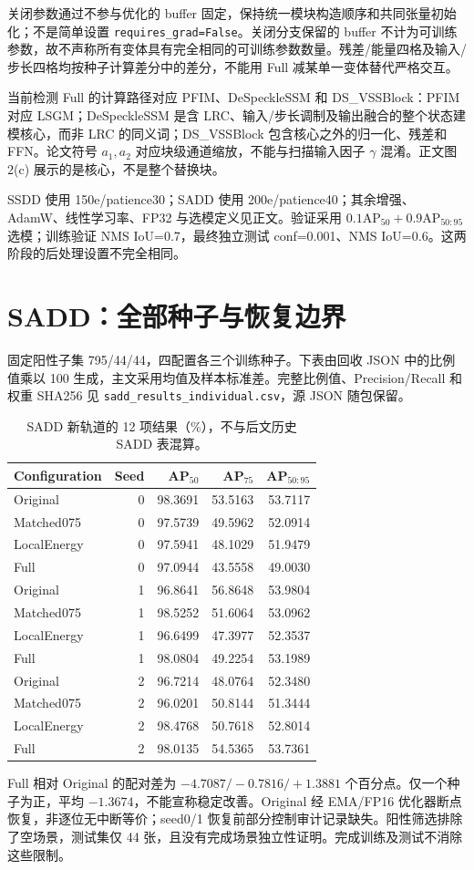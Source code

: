 \documentclass[UTF8,fontset=fandol,10pt]{ctexart}
\begin{document}
关闭参数通过不参与优化的 buffer 固定，保持统一模块构造顺序和共同张量初始化；不是简单设置 \texttt{requires\_grad=False}。关闭分支保留的 buffer 不计为可训练参数，故不声称所有变体具有完全相同的可训练参数数量。残差/能量四格及输入/步长四格均按种子计算差分中的差分，不能用 Full 减某单一变体替代严格交互。

当前检测 Full 的计算路径对应 PFIM、DeSpeckleSSM 和 DS\_VSSBlock：PFIM 对应 LSGM；DeSpeckleSSM 是含 LRC、输入/步长调制及输出融合的整个状态建模核心，而非 LRC 的同义词；DS\_VSSBlock 包含核心之外的归一化、残差和 FFN。论文符号 $a_1,a_2$ 对应块级通道缩放，不能与扫描输入因子 $\gamma$ 混淆。正文图 2(c) 展示的是核心，不是整个替换块。

SSDD 使用 150e/patience30；SADD 使用 200e/patience40；其余增强、AdamW、线性学习率、FP32 与选模定义见正文。验证采用 $0.1\mathrm{AP}_{50}+0.9\mathrm{AP}_{50:95}$ 选模；训练验证 NMS IoU=0.7，最终独立测试 conf=0.001、NMS IoU=0.6。这两阶段的后处理设置不完全相同。

\section{SADD：全部种子与恢复边界}
固定阳性子集 795/44/44，四配置各三个训练种子。下表由回收 JSON 中的比例值乘以 100 生成，主文采用均值及样本标准差。完整比例值、Precision/Recall 和权重 SHA256 见 \texttt{sadd\_results\_individual.csv}，源 JSON 随包保留。
\begin{table}[!htbp]
\centering\small
\caption{SADD 新轨道的 12 项结果（\%），不与后文历史 SADD 表混算。}
\begin{tabular}{lrrrr}
\toprule
Configuration & Seed & AP$_{50}$ & AP$_{75}$ & AP$_{50:95}$\\
\midrule
Original & 0 & 98.3691 & 53.5163 & 53.7117 \\
Matched075 & 0 & 97.5739 & 49.5962 & 52.0914 \\
LocalEnergy & 0 & 97.5941 & 48.1029 & 51.9479 \\
Full & 0 & 97.0944 & 43.5558 & 49.0030 \\
Original & 1 & 96.8641 & 56.8648 & 53.9804 \\
Matched075 & 1 & 98.5252 & 51.6064 & 53.0962 \\
LocalEnergy & 1 & 96.6499 & 47.3977 & 52.3537 \\
Full & 1 & 98.0804 & 49.2254 & 53.1989 \\
Original & 2 & 96.7214 & 48.0764 & 52.3480 \\
Matched075 & 2 & 96.0201 & 50.8144 & 51.3444 \\
LocalEnergy & 2 & 98.4768 & 50.7618 & 52.8014 \\
Full & 2 & 98.0135 & 54.5365 & 53.7361 \\
\bottomrule
\end{tabular}
\end{table}
\FloatBarrier
Full 相对 Original 的配对差为 $-4.7087/-0.7816/+1.3881$ 个百分点。仅一个种子为正，平均 $-1.3674$，不能宣称稳定改善。Original 经 EMA/FP16 优化器断点恢复，非逐位无中断等价；seed0/1 恢复前部分控制审计记录缺失。阳性筛选排除了空场景，测试集仅 44 张，且没有完成场景独立性证明。完成训练及测试不消除这些限制。
\end{document}
